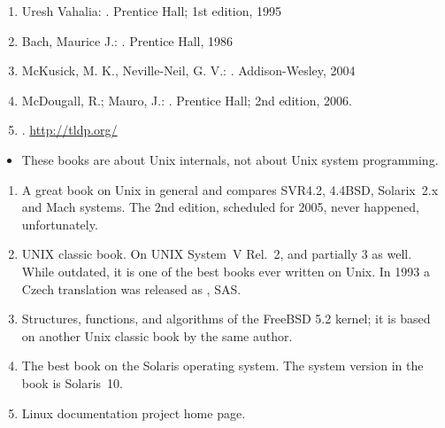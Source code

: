 
\begin{slide}

\begin{enumerate}
\item Uresh Vahalia: .
 Prentice Hall; 1st edition, 1995
\item Bach, Maurice J.: .
Prentice Hall, 1986
\item McKusick, M. K., Neville-Neil, G. V.: . Addison-Wesley, 2004
\item McDougall, R.; Mauro, J.: . Prentice Hall; 2nd
edition, 2006.
\item {}. \url{http://tldp.org/}
\end{enumerate}
\end{slide}

\begin{itemize}
\item These books are about Unix internals, not about Unix system programming.
\end{itemize}

\begin{enumerate}
\item A great book on Unix in general and compares SVR4.2, 4.4BSD, Solarix~2.x
and Mach systems.  The 2nd edition, scheduled for 2005, never happened,
unfortunately.
\item UNIX classic book. On UNIX System~V Rel.~2, and partially 3 as well.
While outdated, it is one of the best books ever written on Unix.  In 1993 a
Czech translation was released as
, SAS.
\item Structures, functions, and algorithms of the FreeBSD 5.2 kernel; it is
based on another Unix classic book  by the same author.
\item The best book on the Solaris operating system.  The system version in the
book is Solaris~10.
\item Linux documentation project home page.
\end{enumerate}

